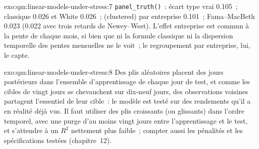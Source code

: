 \begin{solution}{exo:qm:linear-models-under-stress:7}
\texttt{panel\_truth()}~: écart type vrai 0.105~; classique 0.026 et White 0.026~;  (clustered) par entreprise 0.101~; Fama--MacBeth 0.023 (0.022 avec trois
retards de Newey--West). L'effet entreprise est commun à la pente de chaque mois, si bien que ni la formule classique ni la dispersion temporelle des pentes mensuelles
ne le voit~; le regroupement par entreprise, lui, le capte.
\end{solution}

\begin{solution}{exo:qm:linear-models-under-stress:8}
Des plis aléatoires placent des jours postérieurs dans l'ensemble d'apprentissage de chaque jour de test, et comme les cibles de vingt jours se chevauchent sur dix-neuf jours,
des observations voisines partagent l'essentiel de leur cible~: le modèle est testé sur des rendements qu'il a en réalité déjà vus. Il faut utiliser des plis croissants (ou glissants) dans
l'ordre temporel, avec une purge d'au moins vingt jours entre l'apprentissage et le test, et s'attendre à un $R^2$ nettement plus faible~; compter aussi les pénalités et
les spécifications testées (chapitre~12).
\end{solution}

